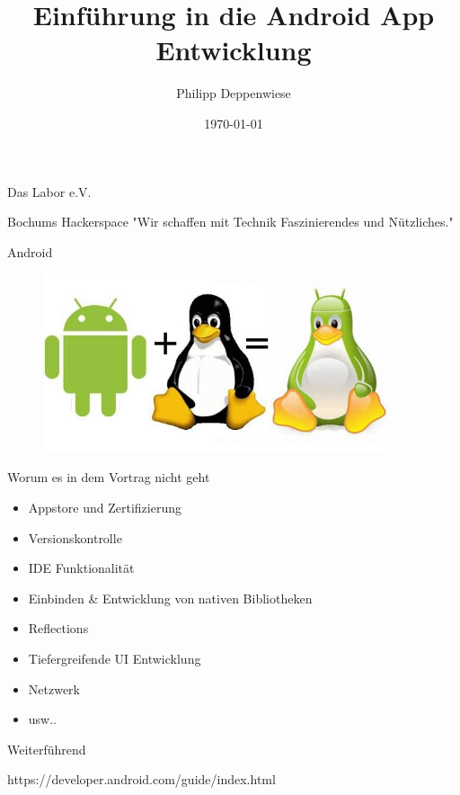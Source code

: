 \documentclass{beamer}
\title[]{Einführung in die Android App Entwicklung}
\author{Philipp Deppenwiese}
\institute{https://github.com/zaolin/android-app-demo}
\date{\today}
\begin{document}
\begin{frame}
\titlepage
\end{frame}

\begin{frame}{Das Labor e.V.}
\begin{block}{Bochums Hackerspace}
"Wir schaffen mit Technik Faszinierendes und Nützliches."
\end{block}
\end{frame}

\begin{frame}{Android}
\begin{figure}[hb]
 \centering
 \includegraphics[width=4in]{android-linux}
\end{figure}
\end{frame}

\begin{frame}{Worum es in dem Vortrag nicht geht}
\begin{itemize}
\item Appstore und Zertifizierung
\item Versionskontrolle
\item IDE Funktionalität
\item Einbinden \& Entwicklung von nativen Bibliotheken
\item Reflections
\item Tiefergreifende UI Entwicklung
\item Netzwerk
\item usw..
\end{itemize}
\end{frame}

\begin{frame}{Weiterführend}
\begin{center}
https://developer.android.com/guide/index.html
\end{center}
\end{frame}
\end{document}
